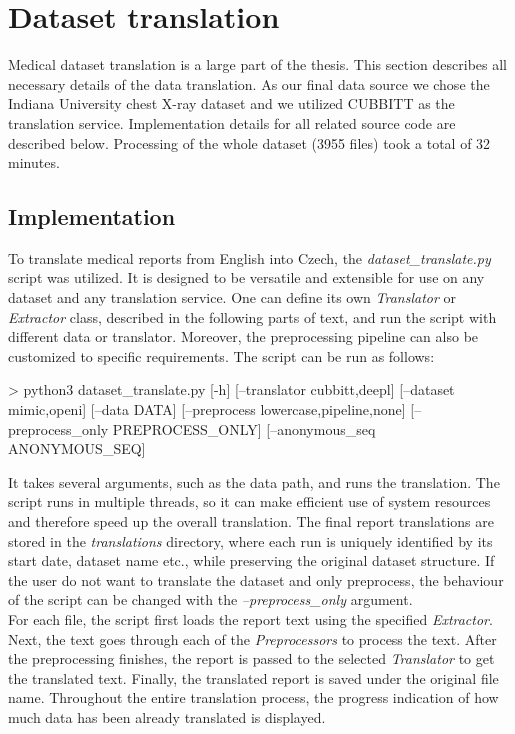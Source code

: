 \section{Dataset translation}
Medical dataset translation is a large part of the thesis. This section describes all necessary details of the data translation. As our final data source we chose the Indiana University chest X-ray dataset and we utilized CUBBITT as the translation service. Implementation details for all related source code are described below. Processing of the whole dataset (3955 files) took a total of 32 minutes.

\subsection{Implementation}
To translate medical reports from English into Czech, the \textit{dataset\_translate.py} script was utilized. It is designed to be versatile and extensible for use on any dataset and any translation service. One can define its own \textit{Translator} or \textit{Extractor} class, described in the following parts of text, and run the script with different data or translator. Moreover, the preprocessing pipeline can also be customized to specific requirements. The script can be run as follows: \\
\begin{code}
> python3 dataset_translate.py [-h] [--translator {cubbitt,deepl}] 
                               [--dataset {mimic,openi}] 
                               [--data DATA]
                               [--preprocess {lowercase,pipeline,none}] 
                               [--preprocess_only PREPROCESS_ONLY]
                               [--anonymous_seq ANONYMOUS_SEQ]
\end{code}

It takes several arguments, such as the data path, and runs the translation. The script runs in multiple threads, so it can make efficient use of system resources and therefore speed up the overall translation. The final report translations are stored in the \textit{translations} directory, where each run is uniquely identified by its start date, dataset name etc., while preserving the original dataset structure. If the user do not want to translate the dataset and only preprocess, the behaviour of the script can be changed with the \textit{--preprocess\_only} argument.\\

For each file, the script first loads the report text using the specified \textit{Extractor}. Next, the text goes through each of the \textit{Preprocessors} to process the text. After the preprocessing finishes, the report is passed to the selected \textit{Translator} to get the translated text. Finally, the translated report is saved under the original file name. Throughout the entire translation process, the progress indication of how much data has been already translated is displayed.\\

